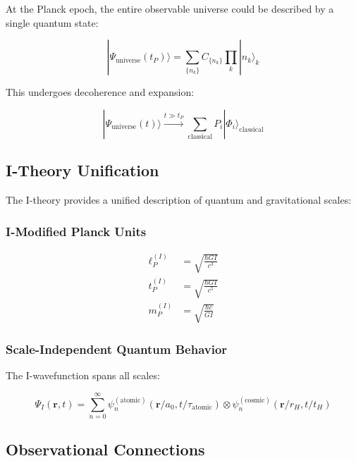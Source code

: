 At the Planck epoch, the entire observable universe could be described by a single quantum state:

\begin{equation}
\label{eq:universal_wavefunction}
|\Psi_{\text{universe}}(t_P)\rangle = \sum_{\{n_k\}} C_{\{n_k\}} \prod_k |n_k\rangle_k
\end{equation}

This undergoes decoherence and expansion:

\begin{equation}
\label{eq:cosmic_decoherence}
|\Psi_{\text{universe}}(t)\rangle \xrightarrow{t \gg t_P} \sum_{\text{classical}} P_i |\Phi_i\rangle_{\text{classical}}
\end{equation}

\subsection{I-Theory Unification}

The I-theory provides a unified description of quantum and gravitational scales:

\subsubsection{I-Modified Planck Units}

\begin{align}
\label{eq:i_planck_length}
\ell_P^{(I)} &= \sqrt{\frac{\hbar G I}{c^3}} \\
\label{eq:i_planck_time}
t_P^{(I)} &= \sqrt{\frac{\hbar G I}{c^5}} \\
\label{eq:i_planck_mass}
m_P^{(I)} &= \sqrt{\frac{\hbar c}{GI}}
\end{align}

\subsubsection{Scale-Independent Quantum Behavior}

The I-wavefunction spans all scales:

\begin{equation}
\label{eq:i_wavefunction_multiscale}
\Psi_I(\mathbf{r}, t) = \sum_{n=0}^\infty \psi_n^{(\text{atomic})}(\mathbf{r}/a_0, t/\tau_{\text{atomic}}) \otimes \psi_n^{(\text{cosmic})}(\mathbf{r}/r_H, t/t_H)
\end{equation}

\subsection{Observational Connections}


